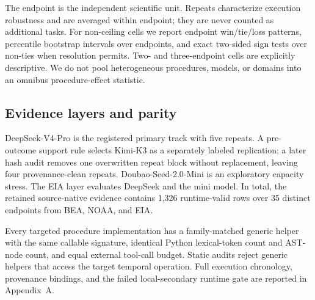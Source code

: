 The endpoint is the independent scientific unit. Repeats characterize execution robustness and are averaged within endpoint; they are never counted as additional tasks. For non-ceiling cells we report endpoint win/tie/loss patterns, percentile bootstrap intervals over endpoints, and exact two-sided sign tests over non-ties when resolution permits. Two- and three-endpoint cells are explicitly descriptive. We do not pool heterogeneous procedures, models, or domains into an omnibus procedure-effect statistic.

\subsection{Evidence layers and parity}
DeepSeek-V4-Pro is the registered primary track with five repeats. A pre-outcome support rule selects Kimi-K3 as a separately labeled replication; a later hash audit removes one overwritten repeat block without replacement, leaving four provenance-clean repeats. Doubao-Seed-2.0-Mini is an exploratory capacity stress. The EIA layer evaluates DeepSeek and the mini model. In total, the retained source-native evidence contains 1,326 runtime-valid rows over 35 distinct endpoints from BEA, NOAA, and EIA.

Every targeted procedure implementation has a family-matched generic helper with the same callable signature, identical Python lexical-token count and AST-node count, and equal external tool-call budget. Static audits reject generic helpers that access the target temporal operation. Full execution chronology, provenance bindings, and the failed local-secondary runtime gate are reported in Appendix~A.
